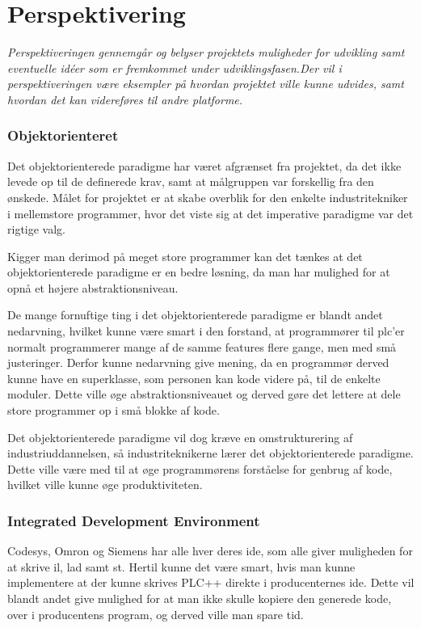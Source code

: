\chapter{Perspektivering}
\label{sec:Perspektivering}
\textit{Perspektiveringen gennemgår og belyser projektets muligheder for udvikling samt eventuelle idéer som er fremkommet under udviklingsfasen.Der vil i perspektiveringen være eksempler på hvordan projektet ville kunne udvides, samt hvordan det kan videreføres til andre platforme.}

\subsection*{Objektorienteret}
Det objektorienterede paradigme har været afgrænset fra projektet, da det ikke levede op til de definerede krav, samt at målgruppen var forskellig fra den ønskede.
Målet for projektet er at skabe overblik for den enkelte industritekniker i mellemstore programmer, hvor det viste sig at det imperative paradigme var det rigtige valg.

Kigger man derimod på meget store programmer kan det tænkes at det objektorienterede paradigme er en bedre løsning, da man har mulighed for at opnå et højere abstraktionsniveau.

De mange fornuftige ting i det objektorienterede paradigme er blandt andet nedarvning, hvilket kunne være smart i den forstand, at programmører til \gls{plc}'er normalt programmerer mange af de samme features flere gange, men med små justeringer.
Derfor kunne nedarvning give mening, da en programmør derved kunne have en superklasse, som personen kan kode videre på, til de enkelte moduler.
Dette ville øge abstraktionsniveauet og derved gøre det lettere at dele store programmer op i små blokke af kode.

Det objektorienterede paradigme vil dog kræve en omstrukturering af industriuddannelsen, så industriteknikerne lærer det objektorienterede paradigme.
Dette ville være med til at øge programmørens forståelse for genbrug af kode, hvilket ville kunne øge produktiviteten.

\subsection*{Integrated Development Environment}
Codesys, Omron og Siemens har alle hver deres \gls{ide}, som alle giver muligheden for at skrive \gls{il}, \gls{lad} samt \gls{st}.
Hertil kunne det være smart, hvis man kunne implementere at der kunne skrives PLC++ direkte i producenternes \gls{ide}. Dette vil blandt andet give mulighed for at man ikke skulle kopiere den generede kode, over i producentens program, og derved ville man spare tid.

